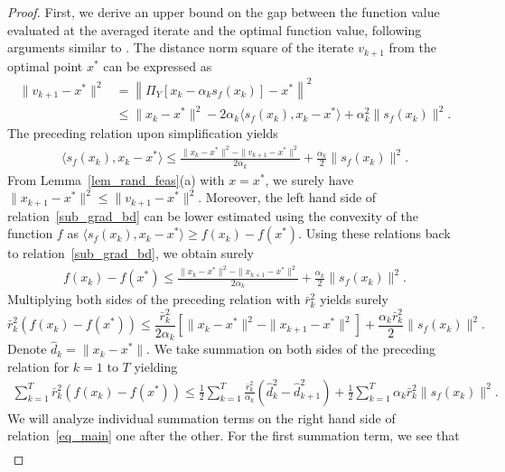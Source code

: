 \documentclass{article}
\theoremstyle{plain}
\theoremstyle{definition}
\theoremstyle{remark}
\begin{document}
\begin{proof}
First, we derive an upper bound on the gap between the function value evaluated at the averaged iterate and the optimal function value, following arguments similar to \cite{khaled2023dowg}. The distance norm square of the iterate $v_{k+1}$ from the optimal point $x^*$ can be expressed as
\begin{align*}
    \| v_{k+1} - x^* \|^2
&= \left\| \Pi_Y \left[x_k - \alpha_k s_f(x_k)\right] - x^* \right\|^2 \\
&\leq \| x_k - x^* \|^2 - 2\alpha_k \langle s_f(x_k), x_k - x^* \rangle + \alpha_k^2 \| s_f(x_k) \|^2 .
\end{align*}
The preceding relation upon simplification yields
\begin{align}
    \langle s_f(x_k), x_k - x^* \rangle
\leq \frac{\| x_k - x^* \|^2 - \| v_{k+1} - x^* \|^2}{2\alpha_k} + \frac{\alpha_k}{2} \| s_f(x_k) \|^2 . \label{sub_grad_bd}
\end{align}
From Lemma~\ref{lem_rand_feas}(a) with $x = x^*$, we surely have $\| x_{k+1} - x^* \|^2 \leq \| v_{k+1} - x^* \|^2$. Moreover, the left hand side of relation~\eqref{sub_grad_bd} can be lower estimated using the convexity of the function $f$ as $\langle s_f(x_k), x_k - x^* \rangle \geq f(x_k) - f(x^*)$. Using these relations back to relation~\eqref{sub_grad_bd}, we obtain surely 
\begin{align*}
    f(x_k) - f(x^*) \leq \frac{\| x_k - x^* \|^2 - \| x_{k+1} - x^* \|^2}{2\alpha_k}
+ \frac{\alpha_k}{2} \| s_f(x_k) \|^2 .
\end{align*}
Multiplying both sides of the preceding relation with $\bar{r}_k^2$ yields surely
\[
\bar{r}_k^2 \left(f(x_k) - f(x^*)\right)
\leq \frac{\bar{r}_k^2}{2\alpha_k} \left[ \| x_k - x^* \|^2 - \| x_{k+1} - x^* \|^2 \right]
+ \frac{\alpha_k \bar{r}_k^2}{2} \| s_f(x_k) \|^2 .
\]
Denote $\hat d_k = \| x_k - x^* \|$. We take summation on both sides of the preceding relation for $k = 1$ to $T$ yielding
\begin{align}
    \sum_{k=1}^{T} \bar{r}_k^2 \left( f(x_k) - f(x^*) \right)
    \leq \frac{1}{2} \sum_{k=1}^{T} \frac{\bar{r}_k^2}{\alpha_k} \left(\hat d_k^2 - \hat d_{k+1}^2 \right) 
    + \frac{1}{2} \sum_{k=1}^{T} \alpha_k \bar{r}_k^2 \| s_f(x_k) \|^2 . \label{eq_main}
\end{align}
We will analyze individual summation terms on the right hand side of relation~\eqref{eq_main} one after the other. For the first summation term, we see that
\begin{align*}

\end{align*}
\end{proof}
\end{document}

